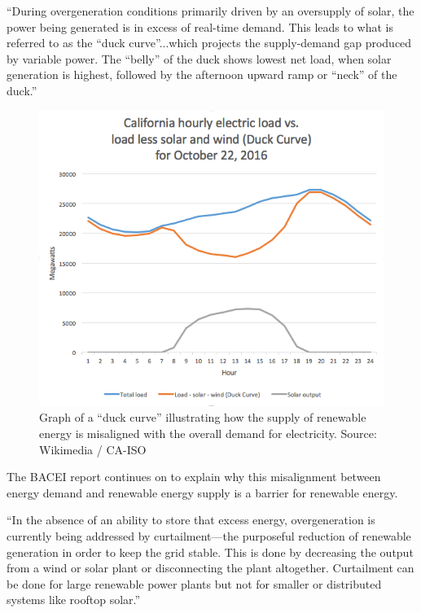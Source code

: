 \documentclass[hidelinks,12pt,a4paper]{article}
\begin{document}
\begin{displayquote}
“During overgeneration conditions primarily driven by an oversupply of solar, the power being generated is in excess of real-time demand. This leads to what is referred to as the “duck curve”...which projects the supply-demand gap produced by variable power. The “belly” of the duck shows lowest net load, when solar generation is highest, followed by the afternoon upward ramp or “neck” of the duck.”
\cite{EnergyStorageCaliforniaClimateandEnergyGoals}
\end{displayquote}

\begin{figure}[ht!]
    \centering
    \includegraphics[width=.8\textwidth]{duck-curve-ca-iso-2016-10-22.png}
    \caption{Graph of a “duck curve” illustrating how the supply of renewable energy is misaligned with the overall demand for electricity. Source: Wikimedia / CA-ISO \cite{DuckCurveGraphicFromWikimedia}}
\end{figure}
\FloatBarrier

The BACEI report continues on to explain why this misalignment between energy demand and renewable energy supply is a barrier for renewable energy.

  \begin{displayquote}
“In the absence of an ability to store that excess energy, overgeneration is currently being addressed by curtailment—the purposeful reduction of renewable generation in order to keep the grid stable. This is done by decreasing the output from a wind or solar plant or disconnecting the plant altogether. Curtailment can be done for large renewable power plants but not for smaller or distributed systems like rooftop solar.” \cite{EnergyStorageCaliforniaClimateandEnergyGoals}
\end{displayquote}
\end{document}
